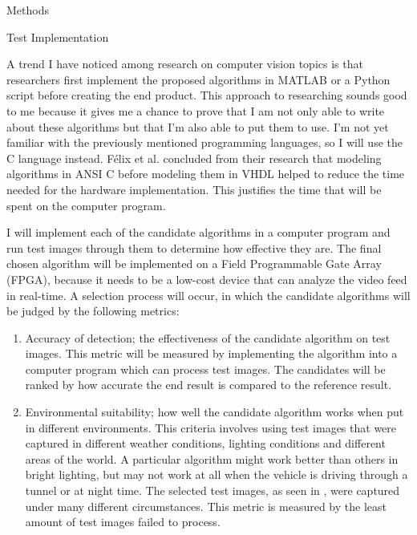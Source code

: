 \documentclass{matthijs}
\begin{document}
	\begin{hoofdstuk}{Methods}

		\begin{paragraaf}{Test Implementation}

			A trend I have noticed among research on computer vision topics is that researchers first implement the proposed algorithms in MATLAB or a Python script before creating the end product.
			This approach to researching sounds good to me because it gives me a chance to prove that I am not only able to write about these algorithms but that I'm also able to put them to use.
			I'm not yet familiar with the previously mentioned programming languages, so I will use the C language instead.
			F\'elix et al. \cite{felix2003low} concluded from their research that modeling algorithms in ANSI C before modeling them in VHDL helped to reduce the time needed for the hardware implementation.
			This justifies the time that will be spent on the computer program.
			\bigskip

			I will implement each of the candidate algorithms in a computer program and run test images through them to determine how effective they are.
			The final chosen algorithm will be implemented on a Field Programmable Gate Array (FPGA), because it needs to be a low-cost device that can analyze the video feed in real-time.
			A selection process will occur, in which the candidate algorithms will be judged by the following metrics:

			\begin{enumerate}

				\item	Accuracy of detection; the effectiveness of the candidate algorithm on test images.
					This metric will be measured by implementing the algorithm into a computer program which can process test images.
					The candidates will be ranked by how accurate the end result is compared to the reference result.

				\item	Environmental suitability; how well the candidate algorithm works when put in different environments.
					This criteria involves using test images that were captured in different weather conditions, lighting conditions and different areas of the world.
					A particular algorithm might work better than others in bright lighting, but may not work at all when the vehicle is driving through a tunnel or at night time.
					The selected test images, as seen in , were captured under many different circumstances.
					This metric is measured by the least amount of test images failed to process.


\end{enumerate}
\end{paragraaf}
\end{hoofdstuk}
\end{document}
